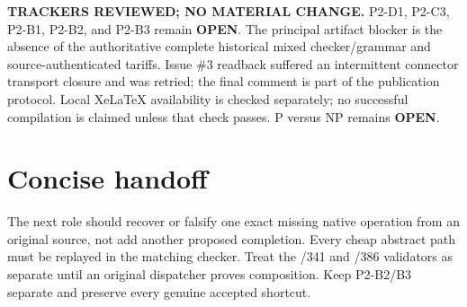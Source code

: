 \documentclass[11pt]{article}
\newcommand{\status}[1]{\textbf{#1}}
\begin{document}
\textbf{TRACKERS REVIEWED; NO MATERIAL CHANGE.}  P2-D1, P2-C3, P2-B1,
P2-B2, and P2-B3 remain \status{OPEN}.  The principal artifact blocker is the
absence of the authoritative complete historical mixed checker/grammar and
source-authenticated tariffs.  Issue \#3 readback suffered an intermittent
connector transport closure and was retried; the final comment is part of the
publication protocol.  Local XeLaTeX availability is checked separately; no
successful compilation is claimed unless that check passes.  P versus NP
remains \status{OPEN}.

\section{Concise handoff}
The next role should recover or falsify one exact missing native operation from
an original source, not add another proposed completion.  Every cheap abstract
path must be replayed in the matching checker.  Treat the /341 and /386
validators as separate until an original dispatcher proves composition.  Keep
P2-B2/B3 separate and preserve every genuine accepted shortcut.

\end{document}
